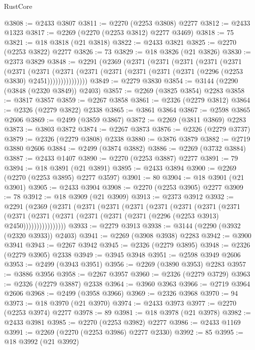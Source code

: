 \begin{lexlean}{RustCore}
\begin{coremodule}
@3808 := @2433 @3807
@3811 := @2270 (@2253 @3808) @2277
@3812 := @2433 @1323
@3817 := @2269 (@2270 (@2253 @3812) @2277 @3469)
@3818 := 75
@3821 := @18 @3818 (@21 @3818)
@3822 := @2433 @3821
@3825 := @2270 (@2253 @3822) @2277
@3826 := 73
@3829 := @18 @3826 (@21 @3826)
@3830 := @2373 @3829
@3848 := @2291
    (@2369
      (@2371
        (@2371
          (@2371
            (@2371
              (@2371
                (@2371
                  (@2371
                    (@2371
                      (@2371 (@2371 (@2371 (@2371 (@2371 (@2296 (@2253 @3830) @2451)))))))))))))))
@3849 := @2279 @3830
@3854 := @3144 (@2290 (@3848 (@2320 @3849)) @2403)
@3857 := @2269 (@3825 @3854) @2283
@3858 := @3817 @3857
@3859 := @2267 @3858
@3861 := @2326 (@2279 @3812)
@3864 := @2326 (@2279 @3822) @2338
@3865 := @3861 @3864
@3867 := @2598 @3865 @2606
@3869 := @2499 (@3859 @3867)
@3872 := @2269 (@3811 @3869) @2283
@3873 := @3803 @3872
@3874 := @2267 @3873
@3876 := @2326 (@2279 @3737)
@3879 := @2326 (@2279 @3808) @2338
@3880 := @3876 @3879
@3882 := @2719 @3880 @2606
@3884 := @2499 (@3874 @3882)
@3886 := @2269 (@3732 @3884)
@3887 := @2433 @1407
@3890 := @2270 (@2253 @3887) @2277
@3891 := 79
@3894 := @18 @3891 (@21 @3891)
@3895 := @2433 @3894
@3900 := @2269 (@2270 (@2253 @3895) @2277 @3597)
@3901 := 80
@3904 := @18 @3901 (@21 @3901)
@3905 := @2433 @3904
@3908 := @2270 (@2253 @3905) @2277
@3909 := 78
@3912 := @18 @3909 (@21 @3909)
@3913 := @2373 @3912
@3932 := @2291
    (@2369
      (@2371
        (@2371
          (@2371
            (@2371
              (@2371
                (@2371
                  (@2371
                    (@2371
                      (@2371
                        (@2371
                          (@2371 (@2371 (@2371 (@2371 (@2296 (@2253 @3913) @2450))))))))))))))))
@3933 := @2279 @3913
@3938 := @3144 (@2290 (@3932 (@2320 @3933)) @2403)
@3941 := @2269 (@3908 @3938) @2283
@3942 := @3900 @3941
@3943 := @2267 @3942
@3945 := @2326 (@2279 @3895)
@3948 := @2326 (@2279 @3905) @2338
@3949 := @3945 @3948
@3951 := @2598 @3949 @2606
@3953 := @2499 (@3943 @3951)
@3956 := @2269 (@3890 @3953) @2283
@3957 := @3886 @3956
@3958 := @2267 @3957
@3960 := @2326 (@2279 @3729)
@3963 := @2326 (@2279 @3887) @2338
@3964 := @3960 @3963
@3966 := @2719 @3964 @2606
@3968 := @2499 (@3958 @3966)
@3969 := @2326 @3968
@3970 := 94
@3973 := @18 @3970 (@21 @3970)
@3974 := @2433 @3973
@3977 := @2270 (@2253 @3974) @2277
@3978 := 89
@3981 := @18 @3978 (@21 @3978)
@3982 := @2433 @3981
@3985 := @2270 (@2253 @3982) @2277
@3986 := @2433 @1169
@3991 := @2269 (@2270 (@2253 @3986) @2277 @2330)
@3992 := 85
@3995 := @18 @3992 (@21 @3992)

\end{coremodule}
\end{lexlean}
